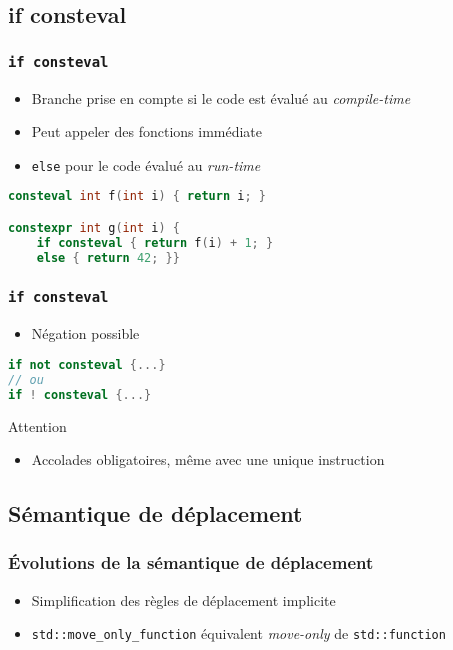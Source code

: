 \documentclass[C++.tex]{subfiles}
\begin{document}
\subsection*{if consteval}
\begin{frame}[fragile]
	\frametitle{\lstinline|if consteval|}
	\begin{itemize}
		\item Branche prise en compte si le code est évalué au \textit{compile-time}
		\item Peut appeler des fonctions immédiate


		\item \lstinline|else| pour le code évalué au \textit{run-time}
	\end{itemize}

	\begin{lstlisting}[language=C++]
consteval int f(int i) { return i; }

constexpr int g(int i) {
	if consteval { return f(i) + 1; } 
	else { return 42; }}\end{lstlisting}
\end{frame}

\begin{frame}[fragile]
	\frametitle{\lstinline|if consteval|}
	\begin{itemize}
		\item Négation possible
	\end{itemize}

	\begin{lstlisting}[language=C++]
if not consteval {...}
// ou
if ! consteval {...}\end{lstlisting}

	\begin{alertblock}{Attention}
		\begin{itemize}
			\item Accolades obligatoires, même avec une unique instruction
		\end{itemize}
	\end{alertblock}
\end{frame}

\subsection*{Sémantique de déplacement}
\begin{frame}[fragile]
	\frametitle{Évolutions de la sémantique de déplacement}
	\begin{itemize}
		\item Simplification des règles de déplacement implicite
		\item \lstinline|std::move_only_function| équivalent \textit{move-only} de \lstinline|std::function|
	\end{itemize}
\end{frame}
\end{document}
